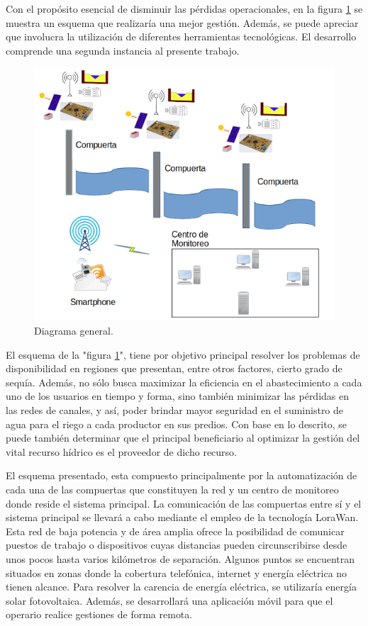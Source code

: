 Con el propósito esencial de disminuir las pérdidas operacionales, en la figura \ref{fig:DiagramaEnBloqueGeneralV1} se muestra un esquema que realizaría una mejor gestión.
Además, se puede apreciar que involucra la utilización de diferentes herramientas tecnológicas. El desarrollo comprende una segunda instancia al presente trabajo. 
    
\begin{figure}[h]
\centering

\includegraphics[width=1\textwidth]{./Figures/DiagramaEnBloqueGeneralV2.png}
\caption{Diagrama general.}
\label{fig:DiagramaEnBloqueGeneralV1}
\end{figure}

El esquema de la "figura \ref{fig:DiagramaEnBloqueGeneralV1}", tiene por objetivo principal resolver los problemas de disponibilidad en regiones que presentan, entre otros factores, cierto grado de sequía. Además, no sólo busca maximizar la eficiencia en el abastecimiento a cada uno de los usuarios en tiempo y forma, sino también minimizar las pérdidas en las redes de canales, y así, poder brindar mayor seguridad en el suministro de agua para el riego a cada productor en sus predios.
Con base en lo descrito, se puede también determinar que el principal beneficiario al optimizar la gestión del vital recurso hídrico es el proveedor de dicho recurso.

El esquema presentado, esta compuesto principalmente por la automatización de cada una de las compuertas que constituyen la red y un centro de monitoreo donde reside el sistema principal. La comunicación de las compuertas entre sí y el sistema principal se llevará a cabo mediante el empleo de la tecnología LoraWan. Esta red de baja potencia y de área amplia ofrece la posibilidad de comunicar puestos de trabajo o dispositivos cuyas distancias pueden circunscribirse desde unos pocos hasta varios kilómetros de separación. Algunos puntos se encuentran situados en zonas donde la cobertura telefónica, internet y energía eléctrica no tienen alcance. Para resolver la carencia de energía eléctrica, se utilizaría energía solar fotovoltaica. Además, se desarrollará una aplicación móvil para que el operario realice gestiones de forma remota.

